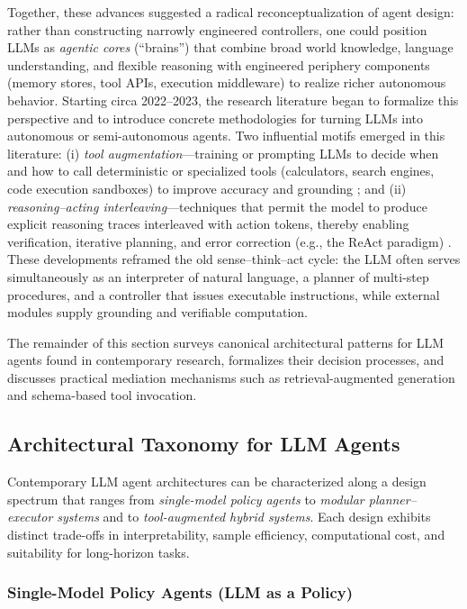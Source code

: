 Together, these advances suggested a radical reconceptualization of agent design: rather than constructing narrowly engineered controllers, one could position LLMs as \emph{agentic cores} (``brains'') that combine broad world knowledge, language understanding, and flexible reasoning with engineered periphery components (memory stores, tool APIs, execution middleware) to realize richer autonomous behavior.  Starting circa 2022–2023, the research literature began to formalize this perspective and to introduce concrete methodologies for turning LLMs into autonomous or semi-autonomous agents.  Two influential motifs emerged in this literature: (i) \emph{tool augmentation}—training or prompting LLMs to decide when and how to call deterministic or specialized tools (calculators, search engines, code execution sandboxes) to improve accuracy and grounding \cite{schick23}; and (ii) \emph{reasoning–acting interleaving}—techniques that permit the model to produce explicit reasoning traces interleaved with action tokens, thereby enabling verification, iterative planning, and error correction (e.g., the ReAct paradigm) \cite{yao22}.  These developments reframed the old sense–think–act cycle: the LLM often serves simultaneously as an interpreter of natural language, a planner of multi-step procedures, and a controller that issues executable instructions, while external modules supply grounding and verifiable computation.

The remainder of this section surveys canonical architectural patterns for LLM agents found in contemporary research, formalizes their decision processes, and discusses practical mediation mechanisms such as retrieval-augmented generation and schema-based tool invocation.

\subsection{Architectural Taxonomy for LLM Agents}
\label{sec:architectures}

Contemporary LLM agent architectures can be characterized along a design spectrum that ranges from \emph{single-model policy agents} to \emph{modular planner–executor systems} and to \emph{tool-augmented hybrid systems}.  Each design exhibits distinct trade-offs in interpretability, sample efficiency, computational cost, and suitability for long-horizon tasks.

\subsubsection{Single-Model Policy Agents (LLM as a Policy)}
\label{sec:single_model}

